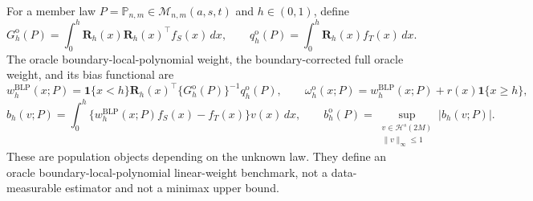 For a member law \(P=\mathbb P_{n,m}\in\mathcal M_{n,m}(a,s,t)\) and \(h\in(0,1)\), define
\[
G_h^{\mathrm o}(P)=\int_0^h\mathbf R_h(x)\mathbf R_h(x)^\top f_S(x)\,dx,
\qquad
q_h^{\mathrm o}(P)=\int_0^h\mathbf R_h(x)f_T(x)\,dx.
\]
The oracle boundary-local-polynomial weight, the boundary-corrected full oracle weight, and its bias functional are
\[
w_h^{\mathrm{BLP}}(x;P)=\mathbf 1\{x<h\}\mathbf R_h(x)^\top
\{G_h^{\mathrm o}(P)\}^{-1}q_h^{\mathrm o}(P),
\qquad
\omega_h^{\mathrm o}(x;P)=w_h^{\mathrm{BLP}}(x;P)+r(x)\mathbf 1\{x\ge h\},
\]
\[
b_h(v;P)=\int_0^h\{w_h^{\mathrm{BLP}}(x;P)f_S(x)-f_T(x)\}v(x)\,dx,
\qquad
b_h^{\mathrm o}(P)=
\sup_{\substack{v\in\mathcal H^s(2M)\\ \|v\|_\infty\le1}}|b_h(v;P)|.
\]
These are population objects depending on the unknown law. They define an oracle boundary-local-polynomial linear-weight benchmark, not a data-measurable estimator and not a minimax upper bound.
